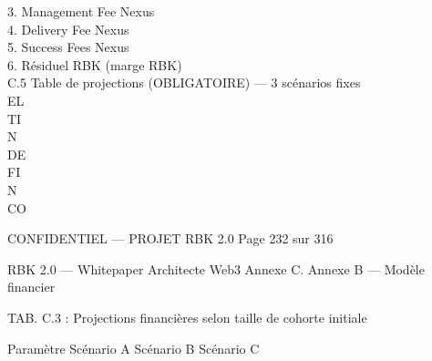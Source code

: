 \documentclass[12pt,landscape,a4paper]{article}
\newenvironment{confidential}
{\begin{tcolorbox}[
    colback=rbkred!5!white,
    colframe=rbkred!75!black,
    title=CONFIDENTIEL,
    fonttitle=\bfseries\color{white},
    coltitle=rbkred!75!black,
    breakable,
    enhanced,
    frame hidden,
    borderline west={2pt}{0pt}{rbkred!75!black}
]}
{\end{tcolorbox}}
\begin{document}
\vspace{0.5em}
\vspace{0.5em}
3. Management Fee Nexus\\
\vspace{0.5em}
4. Delivery Fee Nexus\\
\vspace{0.5em}
5. Success Fees Nexus\\
\vspace{0.5em}
6. Résiduel RBK (marge RBK)\\
\vspace{0.5em}
\vspace{0.5em}
\vspace{0.5em}
C.5 Table de projections (OBLIGATOIRE) — 3 scénarios fixes\\
\vspace{0.5em}
\vspace{0.5em}
\vspace{0.5em}
\vspace{0.5em}
EL\\
TI\\
N\\
DE\\
FI\\
N\\
CO\\
\vspace{0.5em}
\vspace{0.5em}
\vspace{0.5em}
\vspace{0.5em}
\begin{confidential}CONFIDENTIEL — PROJET RBK 2.0               Page 232 sur 316\end{confidential}
RBK 2.0 — Whitepaper Architecte Web3                                                                            Annexe C. Annexe B — Modèle financier\\
\vspace{0.5em}
\vspace{0.5em}
\vspace{0.5em}
\vspace{0.5em}
\begin{center}\begin{tabular}TAB. C.3 : Projections financières selon taille de cohorte initiale\end{tabular}\end{center}
\vspace{0.5em}
\vspace{0.5em}
Paramètre                          Scénario A       Scénario B    Scénario C\\
\end{document}
